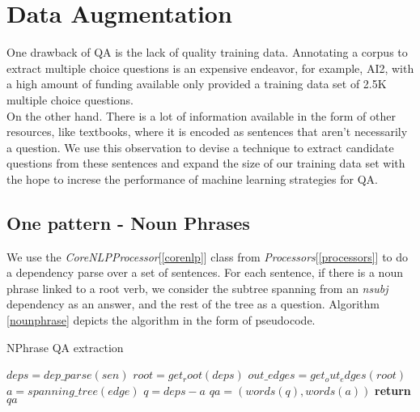 \section{Data Augmentation}

One drawback of QA is the lack of quality training data. Annotating a corpus to extract multiple choice questions is an expensive endeavor, for example, AI2, with a high amount of funding available only provided a training data set of 2.5K multiple choice questions.\\
On the other hand. There is a lot of information available in the form of other resources, like textbooks, where it is encoded as sentences that aren't necessarily a question. We use this observation to devise a technique to extract candidate questions from these sentences and expand the size of our training data set with the hope to increse the performance of machine learning strategies for QA.\\

\subsection{One pattern - Noun Phrases}

We use the \emph{CoreNLPProcessor}[\ref{corenlp}] class from \emph{Processors}[\ref{processors}] to do a dependency parse over a set of sentences. For each sentence, if there is a noun phrase linked to a root verb, we consider the subtree spanning from an \emph{nsubj} dependency as an answer, and the rest of the tree as a question. Algorithm \ref{nounphrase} depicts the algorithm in the form of pseudocode.\\

\begin{algorithm}
\caption{NPhrase QA extraction}\label{nounphrase}
\begin{algorithmic}[1]
   \State $deps = dep\_parse(sen)$
   \State $root = get_root(deps)$
   \State $out\_edges = get_out_edges(root)$
		\State $a = spanning\_tree(edge)$
		\State $q = deps - a$
		\State $qa = (words(q), words(a))$
		\State \textbf{return} $qa$
	\EndIf
   \EndFor
   \EndProcedure
\end{algorithmic}
\end{algorithm}
   
